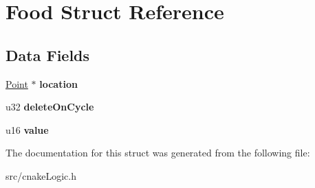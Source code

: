 \hypertarget{struct_food}{}\section{Food Struct Reference}
\label{struct_food}
\subsection*{Data Fields}
\begin{DoxyCompactItemize}
\item 
\hyperlink{struct_point}{Point} $\ast$ {\bfseries location}\hypertarget{struct_food_a89408ee02ab1ebdda1bb89dbfd56f7a1}{}\label{struct_food_a89408ee02ab1ebdda1bb89dbfd56f7a1}

\item 
u32 {\bfseries delete\+On\+Cycle}\hypertarget{struct_food_a6748ed675c840e1a6b6db19cc5b0a606}{}\label{struct_food_a6748ed675c840e1a6b6db19cc5b0a606}

\item 
u16 {\bfseries value}\hypertarget{struct_food_a66236e78407f7f7560eb9ece512621c7}{}\label{struct_food_a66236e78407f7f7560eb9ece512621c7}

\end{DoxyCompactItemize}


The documentation for this struct was generated from the following file\+:\begin{DoxyCompactItemize}
\item 
src/cnake\+Logic.\+h\end{DoxyCompactItemize}
